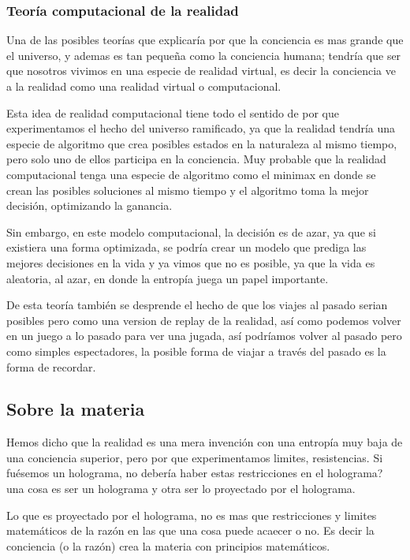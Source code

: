 \documentclass[12pt,letterpaper, a4paper ]{article}
\begin{document}
\subsubsection{Teoría computacional de la realidad}
Una de las posibles teorías que explicaría por que la conciencia es mas grande que el universo, y ademas es tan pequeña como la conciencia humana; tendría que ser que nosotros vivimos en una especie de realidad virtual, es decir la conciencia ve a la realidad como una realidad virtual o computacional. 

Esta idea de realidad computacional tiene todo el sentido de por que experimentamos el hecho del universo ramificado, ya que la realidad tendría una especie de algoritmo que crea posibles estados en la naturaleza al mismo tiempo, pero solo uno de ellos participa en la conciencia. Muy probable que la realidad computacional tenga una especie de algoritmo como el minimax en donde se crean las posibles soluciones al mismo tiempo y el algoritmo toma la mejor decisión, optimizando la ganancia. 

Sin embargo, en este modelo computacional, la decisión es de azar, ya que si existiera una forma optimizada, se podría crear un modelo que prediga las mejores decisiones en la vida y ya vimos que no es posible, ya que la vida es aleatoria, al azar, en donde la entropía juega un papel importante.


De esta teoría también se desprende el hecho de que los viajes al pasado serian posibles pero como una version de replay de la realidad, así como podemos volver en un juego a lo pasado para ver una jugada, así podríamos volver al pasado pero como simples espectadores, la posible forma de viajar a través del pasado es la forma de recordar.


\subsection{Sobre la materia}
Hemos dicho que la realidad es una mera invención con una entropía muy baja de una conciencia superior, pero por que experimentamos limites, resistencias. Si fuésemos un holograma, no debería haber estas restricciones en el holograma? una cosa es ser un holograma y otra ser lo proyectado por el holograma.

Lo que es proyectado por el holograma, no es mas que restricciones y limites matemáticos de la razón en las que una cosa puede acaecer o no. Es decir la conciencia (o la razón) crea la materia con principios matemáticos.
\end{document}
